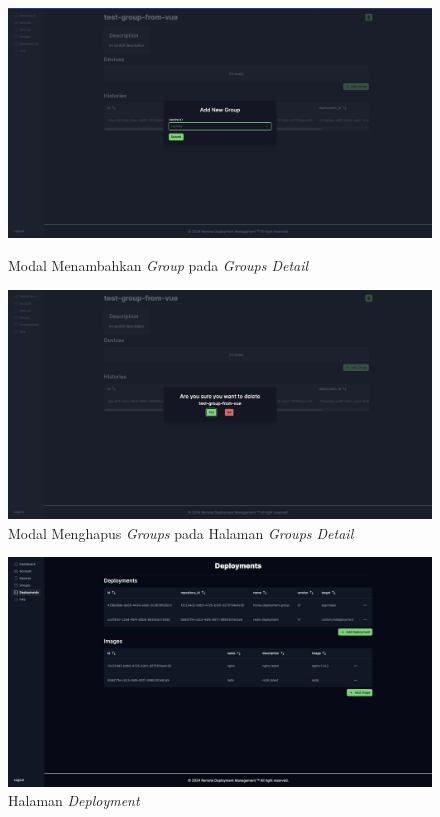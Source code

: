 \begin{figure}[h]
  \centering
  \caption{Modal Menambahkan \textit{Group} pada \textit{Groups Detail}}
  \includegraphics[width=1\textwidth]{resources/chapter-4/dashboard/groups-detail-add-device.jpg}
  \label{fig:halaman-groups-detail-add-group}
\end{figure}

\begin{figure}[h]
  \centering
  \includegraphics[width=1\textwidth]{resources/chapter-4/dashboard/groups-detail-delete.jpg}
  \caption{Modal Menghapus \textit{Groups} pada Halaman \textit{Groups Detail}}
  \label{fig:halaman-groups-detail-delete}
\end{figure}

\begin{figure}[h]
  \centering
  \includegraphics[width=1\textwidth]{resources/chapter-4/dashboard/deployment-page.jpg}
  \caption{Halaman \textit{Deployment}}
  \label{fig:halaman-deployment}
\end{figure}

